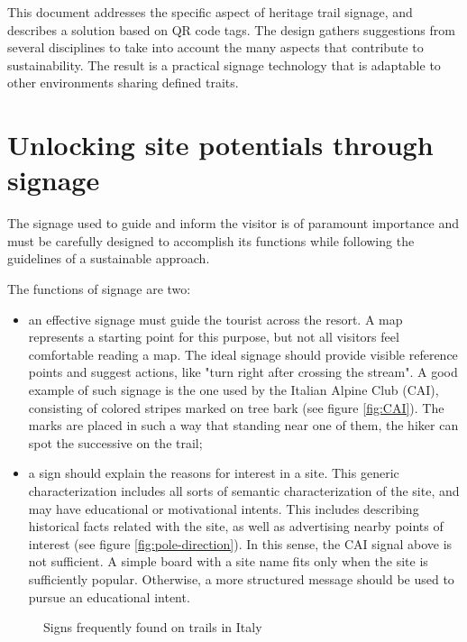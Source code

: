 \documentclass[sustainability,article,submit,pdftex,moreauthors]{Definitions/mdpi}
\begin{document}
This document addresses the specific aspect of heritage trail signage, and describes a solution based on QR code tags. The design gathers suggestions from several disciplines to take into account the many aspects that contribute to sustainability. The result is a practical signage technology that is adaptable to other environments sharing defined traits.

\section{Unlocking site potentials through signage \label{sec:signage}}

The signage used to guide and inform the visitor is of paramount importance and must be carefully designed to accomplish its functions while following the guidelines of a sustainable approach.

The functions of signage are two:
\begin {itemize}
\item an effective signage must guide the tourist across the resort. A map represents a starting point for this purpose, but not all visitors feel comfortable reading a map. The ideal signage should provide visible reference points and suggest actions, like "turn right after crossing the stream". A good example of such signage is the one used by the Italian Alpine Club (CAI), consisting of colored stripes marked on tree bark (see figure \ref{fig:CAI}). The marks are placed in such a way that standing near one of them, the hiker can spot the successive on the trail;
 \item a sign should explain the reasons for interest in a site. This generic characterization includes all sorts of semantic characterization of the site, and may have educational or motivational intents. This includes describing historical facts related with the site, as well as advertising nearby points of interest (see figure \ref{fig:pole-direction}). In this sense, the CAI signal above is not sufficient. A simple board with a site name fits only when the site is sufficiently popular. Otherwise, a more structured message should be used to pursue an educational intent.
\end{itemize}

\begin{figure}
\hfill
{}
\caption{Signs frequently found on trails in Italy}
\label{fig:traditional}
\end{figure}
\end{document}

